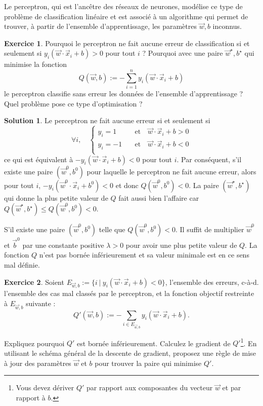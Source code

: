 \documentclass[a4paper,francais]{article}
\theoremstyle{definition}
\newtheorem{exercice}{Exercice}[section]
\newtheorem*{solution}{Solution}
\begin{document}
Le perceptron, qui est l'ancêtre des réseaux de neurones, modélise ce type
de problème de classification linéaire et est associé à un algorithme qui
permet de trouver, à partir de l'ensemble d'apprentissage, les paramètres
$\vec{w},b$ inconnus. 

\begin{exercice}
  Pourquoi le perceptron ne fait aucune erreur de classification
  si et seulement si $y_i (\vec{w}\cdot\vec{x}_i + b) > 0$ pour tout $i$ ?
  Pourquoi avec une paire $\vec{w}^\star,b^\star$ qui minimise la fonction 
  \[
  Q(\vec{w},b) := - \sum^n_{i=1} y_i (\vec{w}\cdot\vec{x}_i + b)
  \]
  le perceptron classifie sans erreur les données de l'ensemble d'apprentissage ?
  Quel problème pose ce type d'optimisation ?
\end{exercice}

\begin{solution}
Le perceptron ne fait aucune erreur si et seulement si 
\[
\forall i, \quad
\left\{
\begin{array}{ll}
  y_i = 1 & \quad \mathrm{et}\quad \vec{w}\cdot\vec{x}_i + b > 0 \\
  y_i = -1 & \quad \mathrm{et}\quad \vec{w}\cdot\vec{x}_i + b < 0 \\
\end{array}
\right.
\]
ce qui est équivalent à $- y_i (\vec{w}\cdot\vec{x}_i + b) < 0$ pour tout $i$.
Par conséquent, s'il existe une paire $(\vec{w}^0,b^0)$ pour laquelle
le perceptron ne fait aucune erreur, alors pour tout $i$,
$- y_i (\vec{w}^0\cdot\vec{x}_i + b^0) < 0$ et donc $Q(\vec{w}^0,b^0) < 0$.
La paire $(\vec{w}^\star,b^\star)$ qui donne la plus petite valeur de $Q$
fait aussi bien l'affaire car $Q(\vec{w}^\star,b^\star) \leq Q(\vec{w}^0,b^0) < 0$.

S'il existe une paire $(\vec{w}^0,b^0)$ telle que $Q(\vec{w}^0,b^0) < 0$.
Il suffit de multiplier $\vec{w}^0$ et $\vec{b}^0$ par une constante positive
$\lambda > 0$ pour avoir une plus petite valeur de $Q$. La
fonction $Q$ n'est pas bornée inférieurement et sa valeur minimale
est en ce sens mal définie. 
\end{solution}

\begin{exercice}
  Soient $E_{\vec{w},b} := \{i \ | \ y_i (\vec{w}\cdot\vec{x}_i + b) < 0\}$, l'ensemble des erreurs,
  c-à-d. l'ensemble des cas mal classés par le perceptron, 
  et la fonction objectif restreinte à $E_{\vec{w},b}$ suivante :
  \[
  Q'(\vec{w},b) := - \sum_{i \in E_{\vec{w},b}} y_i (\vec{w}\cdot\vec{x}_i + b).
  \]

  Expliquez pourquoi $Q'$ est bornée inférieurement. 
  Calculez le gradient de $Q'$\footnote{Vous devez dériver $Q'$ par rapport aux
    composantes du vecteur $\vec{w}$ et par rapport à $b$.}.
  En utilisant le schéma général de la descente de gradient,
  proposez une règle de mise à jour des paramètres $\vec{w}$ et $b$
  pour trouver la paire qui minimise $Q'$. 
\end{exercice}
\end{document}
